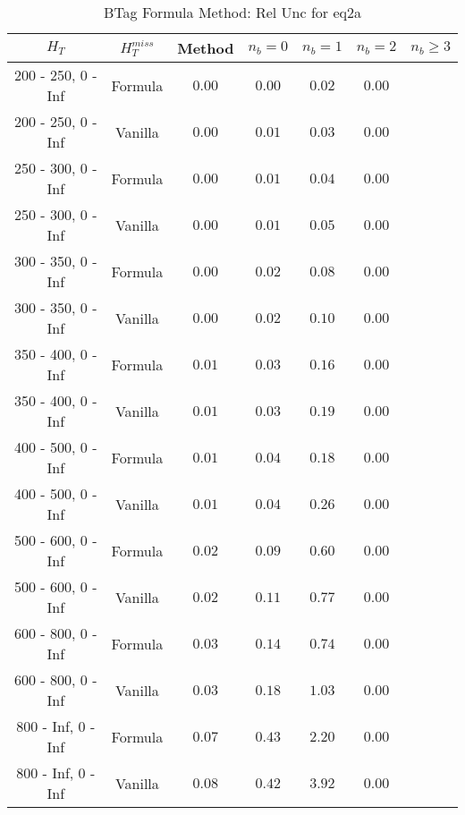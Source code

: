 \begin{longtable}{ | c | c | c | c | c | c | c | }
\caption{BTag Formula Method: Rel Unc for eq2a} \label{tab:eq2a} \\    \hline 
$H_{T}$ & $H_{T}^{miss}$ & Method & $n_{b} = 0$ & $n_{b} = 1$ & $n_{b} = 2$ & $n_{b} \ge 3$ \\ \hline 200 -  250,    0 -  Inf & Formula  & $  0.00 $ & $  0.00 $ & $  0.02 $ & $  0.00 $  \\  
 200 -  250,    0 -  Inf & Vanilla  & $  0.00 $ & $  0.01 $ & $  0.03 $ & $  0.00 $  \\ \hline 
 250 -  300,    0 -  Inf & Formula  & $  0.00 $ & $  0.01 $ & $  0.04 $ & $  0.00 $  \\  
 250 -  300,    0 -  Inf & Vanilla  & $  0.00 $ & $  0.01 $ & $  0.05 $ & $  0.00 $  \\ \hline 
 300 -  350,    0 -  Inf & Formula  & $  0.00 $ & $  0.02 $ & $  0.08 $ & $  0.00 $  \\  
 300 -  350,    0 -  Inf & Vanilla  & $  0.00 $ & $  0.02 $ & $  0.10 $ & $  0.00 $  \\ \hline 
 350 -  400,    0 -  Inf & Formula  & $  0.01 $ & $  0.03 $ & $  0.16 $ & $  0.00 $  \\  
 350 -  400,    0 -  Inf & Vanilla  & $  0.01 $ & $  0.03 $ & $  0.19 $ & $  0.00 $  \\ \hline 
 400 -  500,    0 -  Inf & Formula  & $  0.01 $ & $  0.04 $ & $  0.18 $ & $  0.00 $  \\  
 400 -  500,    0 -  Inf & Vanilla  & $  0.01 $ & $  0.04 $ & $  0.26 $ & $  0.00 $  \\ \hline 
 500 -  600,    0 -  Inf & Formula  & $  0.02 $ & $  0.09 $ & $  0.60 $ & $  0.00 $  \\  
 500 -  600,    0 -  Inf & Vanilla  & $  0.02 $ & $  0.11 $ & $  0.77 $ & $  0.00 $  \\ \hline 
 600 -  800,    0 -  Inf & Formula  & $  0.03 $ & $  0.14 $ & $  0.74 $ & $  0.00 $  \\  
 600 -  800,    0 -  Inf & Vanilla  & $  0.03 $ & $  0.18 $ & $  1.03 $ & $  0.00 $  \\ \hline 
 800 -  Inf,    0 -  Inf & Formula  & $  0.07 $ & $  0.43 $ & $  2.20 $ & $  0.00 $  \\  
 800 -  Inf,    0 -  Inf & Vanilla  & $  0.08 $ & $  0.42 $ & $  3.92 $ & $  0.00 $  \\ \hline 
    \hline 
    \hline 
\end{longtable}
